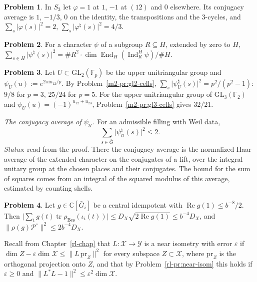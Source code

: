 \documentclass[reqno]{amsart}
\newcounter{chap}
\theoremstyle{plain}
\theoremstyle{definition}
\newtheorem{problem}{Problem}[section]
\theoremstyle{remark}
\newcommand{\C}{\mathbb{C}}
\newcommand{\F}{\mathbb{F}}
\newcommand{\Gb}{\bar G}
\newcommand{\Po}{{\mathcal P^\circ}}
\newcommand{\Uc}{\mathcal U}
\newcommand{\rB}{\rho_{\mathrm{Bes}}}
\newcommand{\GL}{\mathrm{GL}}
\newcommand{\tr}{\operatorname{tr}}
\newcommand{\pr}{\mathrm{pr}}
\newcommand{\End}{\operatorname{End}}
\newcommand{\Ind}{\operatorname{Ind}}
\begin{document}
\begin{problem}\label{pr:s3-average}
In \(S_3\) let \(\varphi = 1\) at \(1\), \(-1\) at \((12)\) and \(0\) elsewhere.  Its conjugacy average is \(1\), \(-1/3\), \(0\) on the identity, the transpositions and the \(3\)-cycles, and \(\sum_s\lvert\varphi(s)\rvert^2 = 2\), \(\sum_s\lvert\varphi^\natural(s)\rvert^2 = 4/3\).
\end{problem}

\begin{problem}\label{pr:conj-average}
For a character \(\psi\) of a subgroup \(R \subseteq H\), extended by zero to \(H\), \(\sum_{s \in H}\lvert\psi^\natural(s)\rvert^2 = \#R^2\cdot\dim\End_H(\Ind_R^H\psi)/\#H\).
\end{problem}

\begin{problem}\label{pr:psi-average}
Let \(U \subset \GL_2(\F_p)\) be the upper unitriangular group and \(\psi_U(u) := e^{2\pi\mathrm i u_{12}/p}\).  By Problem~\ref{m2-pr:gl2-cells}, \(\sum_s\lvert\psi_U^\natural(s)\rvert^2 = p^2/(p^2-1)\): \(9/8\) for \(p = 3\), \(25/24\) for \(p = 5\).  For the upper unitriangular group of \(\GL_3(\F_2)\) and \(\psi_U(u) = (-1)^{u_{12}+u_{23}}\), Problem~\ref{m2-pr:gl3-cells} gives \(32/21\).
\end{problem}

\noindent\emph{The conjugacy average of \(\psi_{\Uc}\).}  For an admissible filling with Weil data,
\[
 \sum_{s \in \Gb}\lvert\psi_{\Uc}^\natural(s)\rvert^2 \le 2 .
\]
\emph{Status}: read from the proof.  There the conjugacy average is the normalized Haar average of the extended character on the conjugates of a lift, over the integral unitary group at the chosen places and their conjugates.  The bound for the sum of squares comes from an integral of the squared modulus of this average, estimated by counting shells.

\begin{problem}\label{pr:one-prime}
Let \(g \in \C[\Gb_i]\) be a central idempotent with \(\operatorname{Re} g(1) \le b^{-8}/2\).  Then \(\bigl\lvert\sum_t g(t)\tr\rB(\iota_i(t))\bigr\rvert \le D_X\sqrt{2\operatorname{Re} g(1)} \le b^{-4}D_X\), and \(\lVert\rho(g)\Po\rVert^2 \le 2b^{-4}D_X\).
\end{problem}

Recall from Chapter~\ref{rl-chap} that \(L\colon\mathcal X\to\mathcal Y\) is a near isometry with error \(\varepsilon\) if \(\dim Z-\varepsilon\dim\mathcal X\le\lVert L\,\pr_Z\rVert^2\) for every subspace \(Z\subset\mathcal X\), where \(\pr_Z\) is the orthogonal projection onto \(Z\), and that by Problem~\ref{rl-pr:near-isom} this holds if \(\varepsilon\ge0\) and \(\lVert L^*L-1\rVert^2\le\varepsilon^2\dim\mathcal X\).
\end{document}
